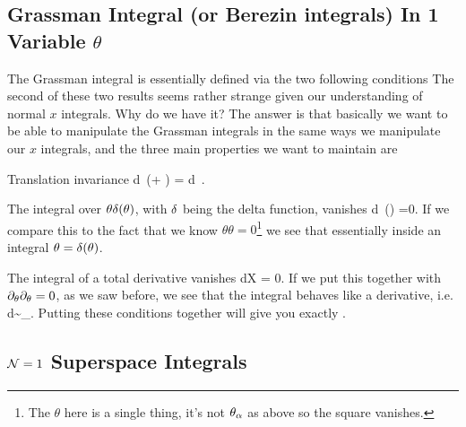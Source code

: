 \subsection{Grassman Integral (or Berezin integrals) In 1 Variable $\theta$}

The Grassman integral is essentially defined via the two following conditions 
\noindent The second of these two results seems rather strange given our understanding of normal $x$ integrals. Why do we have it? The answer is that basically we want to be able to manipulate the Grassman integrals in the same ways we manipulate our $x$ integrals, and the three main properties we want to maintain are 
\ben[label=(\roman*)]
    \item Translation invariance 
    \bse 
        \int d\theta \, (\theta + \epsilon) = \int d\theta \, \theta.
    \ese 
    \item The integral over $\theta\delta(\theta)$, with $\delta$ being the delta function, vanishes
    \bse 
        \int d\theta \, \theta \del(\theta) =0.
    \ese 
    If we compare this to the fact that we know $\theta\theta=0$\footnote{The $\theta$ here is a single thing, it's not $\theta_{\alpha}$ as above so the square vanishes.} we see that essentially inside an integral $\theta = \delta(\theta)$. 
    \item The integral of a total derivative vanishes 
    \bse 
        \int d\theta \frac{\p}{\p \theta}X = 0.
    \ese
    If we put this together with $\partial_{\theta}\partial_{\theta} = 0$, as we saw before, we see that the integral behaves like a derivative, i.e. 
    \bse 
        \int d\theta \sim \p_{\theta}.
    \ese 
\een
Putting these conditions together will give you exactly .

\subsection{$\mathcal{N}=1$ Superspace Integrals}

